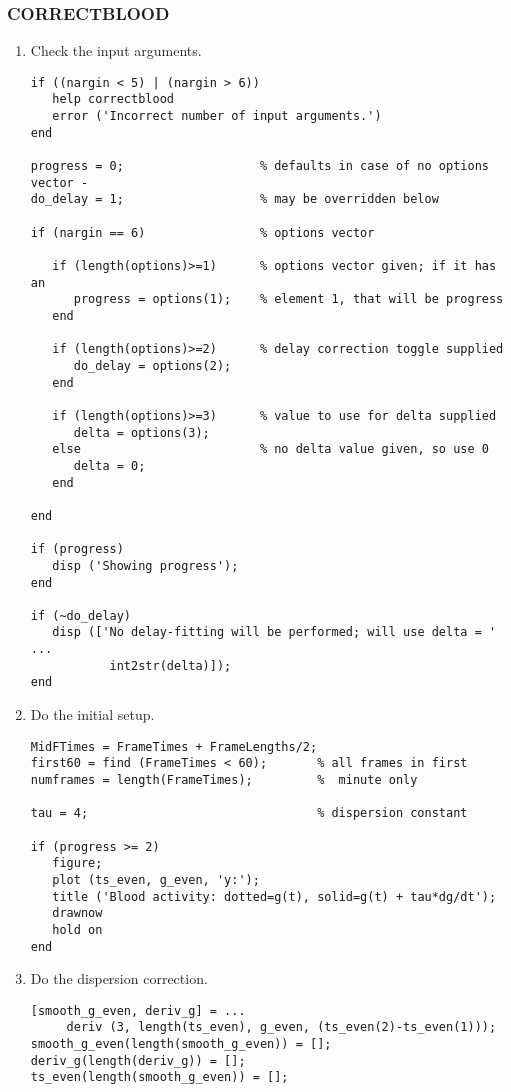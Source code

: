 \subsubsection{CORRECTBLOOD}
\label{sec:correctblood_listing}

\begin{enumerate}

\item Check the input arguments.
\begin{verbatim}
if ((nargin < 5) | (nargin > 6))
   help correctblood
   error ('Incorrect number of input arguments.')
end

progress = 0;                   % defaults in case of no options vector -
do_delay = 1;                   % may be overridden below
   
if (nargin == 6)                % options vector

   if (length(options)>=1)      % options vector given; if it has an
      progress = options(1);    % element 1, that will be progress
   end

   if (length(options)>=2)      % delay correction toggle supplied
      do_delay = options(2);
   end

   if (length(options)>=3)      % value to use for delta supplied
      delta = options(3);
   else                         % no delta value given, so use 0
      delta = 0;                
   end

end

if (progress) 
   disp ('Showing progress');
end

if (~do_delay) 
   disp (['No delay-fitting will be performed; will use delta = ' ...
           int2str(delta)]);
end
\end{verbatim}

\item Do the initial setup.
\begin{verbatim}
MidFTimes = FrameTimes + FrameLengths/2;
first60 = find (FrameTimes < 60);       % all frames in first
numframes = length(FrameTimes);         %  minute only

tau = 4;                                % dispersion constant

if (progress >= 2)
   figure;
   plot (ts_even, g_even, 'y:');
   title ('Blood activity: dotted=g(t), solid=g(t) + tau*dg/dt');
   drawnow
   hold on
end
\end{verbatim}

\item Do the dispersion correction.
\begin{verbatim}
[smooth_g_even, deriv_g] = ...
     deriv (3, length(ts_even), g_even, (ts_even(2)-ts_even(1)));
smooth_g_even(length(smooth_g_even)) = [];
deriv_g(length(deriv_g)) = [];
ts_even(length(smooth_g_even)) = [];
 

\end{verbatim}
\end{enumerate}
